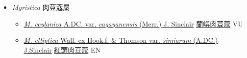 
  \begin{itemize}
 \item[] \textit{Myristica} 肉荳蔻屬
                    
  \begin{itemize}
        \item[] \href{http://www.theplantlist.org/tpl1.1/search?q=Myristica+ceylanica+var.+cagayanensis}{\textit{M. ceylanica} A.DC. var. \textit{cagayanensis} (Merr.) J. Sinclair}   \href{\detokenize{http://taibnet.sinica.edu.tw/chi/taibnet_species_list.php?T2=蘭嶼肉荳蔻&T2_new_value=true&fr=y}}{蘭嶼肉荳蔻} VU
        \item[] \href{http://www.theplantlist.org/tpl1.1/search?q=Myristica+elliptica+var.+simiarum}{\textit{M. elliptica} Wall. ex Hook.f. \& Thomson var. \textit{simiarum} (A.DC.) J.Sinclair}   \href{\detokenize{http://taibnet.sinica.edu.tw/chi/taibnet_species_list.php?T2=紅頭肉豆蔻&T2_new_value=true&fr=y}}{紅頭肉豆蔻} EN
  \end{itemize}
  \end{itemize}
